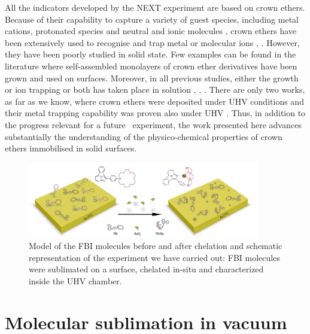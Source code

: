 \documentclass[aps,prl,reprint,longbibliography,superscriptaddress, english]{revtex4-1}
\begin{document}
All the indicators developed by the NEXT experiment are based on crown ethers. Because of their capability to capture a variety of guest species, including metal cations, protonated species and neutral and ionic molecules \cite{dobler1981ionophores}, crown ethers \cite{gokel_crown_1991} have been extensively used to recognise and trap metal or molecular ions \cite{more_intrinsic_1999}, \cite{maleknia_cavity-size-dependent_2002}. However, they have been poorly studied in solid state. Few examples can be found in the literature where self-assembled monolayers of crown ether derivatives have been grown and used on surfaces. Moreover, in all previous studies, either the growth or ion trapping or both has taken place in solution \cite{yoshimoto_hostguest_2003}, \cite{flink_recognition_1999}, \cite{inokuchi_new_2015}. 
 There are only two works, as far as we know, where crown ethers were deposited under UHV conditions \cite{feng_growth_2018} and their metal trapping capability was proven also under UHV \cite{stredansky_-surface_2019}. Thus, in addition to the progress relevant for a future \bbonu\ experiment, the work presented here advances substantially the understanding of the physico-chemical properties of crown ethers immobilised in solid surfaces. 
 

 \begin{figure}[ht!]
	\includegraphics[width=0.9\textwidth]{figures/figura_1a.jpg}
	\caption{\label{ModeloFBI} 
    Model of the FBI molecules before and after chelation and schematic representation of the experiment we have carried out: FBI molecules were sublimated on a surface, chelated in-situ and characterized inside the UHV chamber.}
\end{figure}  


\section{Molecular sublimation in vacuum}
\end{document}
